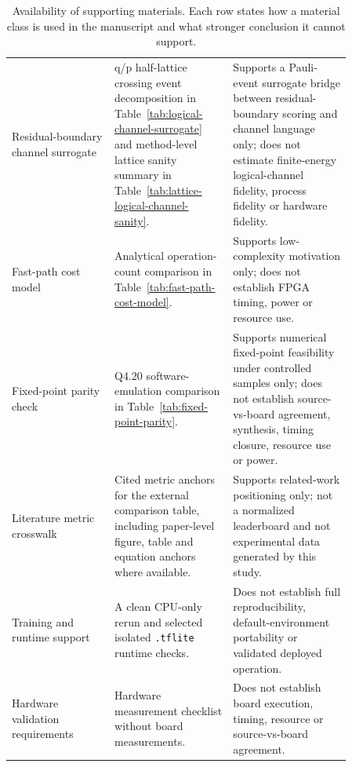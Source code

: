 \documentclass[11pt]{article}
\begin{document}
\begin{table}[htbp]
\begin{tabular}{@{}>{\raggedright\arraybackslash}p{0.26\linewidth}>{\raggedright\arraybackslash}p{0.30\linewidth}>{\raggedright\arraybackslash}p{0.30\linewidth}@{}}
\addlinespace
Residual-boundary channel surrogate & q/p half-lattice crossing event
decomposition in Table~\ref{tab:logical-channel-surrogate} and method-level
lattice sanity summary in Table~\ref{tab:lattice-logical-channel-sanity}. &
Supports a Pauli-event surrogate bridge between residual-boundary scoring and
channel language only; does not estimate finite-energy logical-channel
fidelity, process fidelity or hardware fidelity. \\
\addlinespace
Fast-path cost model & Analytical operation-count comparison in
Table~\ref{tab:fast-path-cost-model}. & Supports low-complexity motivation
only; does not establish FPGA timing, power or resource use. \\
\addlinespace
Fixed-point parity check & Q4.20 software-emulation comparison in
Table~\ref{tab:fixed-point-parity}. & Supports numerical fixed-point
feasibility under controlled samples only; does not establish source-vs-board
agreement, synthesis, timing closure, resource use or power. \\
\addlinespace
Literature metric crosswalk & Cited metric anchors for the external comparison
table, including paper-level figure, table and equation anchors where
available. & Supports related-work positioning only; not a normalized
leaderboard and not experimental data generated by this study. \\
\addlinespace
Training and runtime support & A clean CPU-only rerun and selected isolated
\texttt{.tflite} runtime checks. & Does not establish full
reproducibility, default-environment portability or validated deployed
operation. \\
\addlinespace
Hardware validation requirements & Hardware measurement checklist without board
measurements. & Does not establish board execution, timing, resource or
source-vs-board agreement. \\
\bottomrule
\end{tabular}
\caption{Availability of supporting materials.  Each row states how a material
class is used in the manuscript and what stronger conclusion it cannot support.}
\label{tab:availability}
\end{table}
\end{document}
